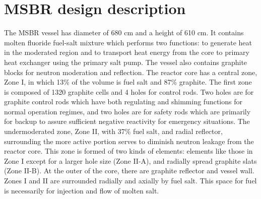 \documentclass{anstrans}
\begin{document}
\section{MSBR design description}
The MSBR vessel has diameter of 680 cm and a height of 610 cm. It contains molten fluoride fuel-salt mixture which performs two functions: to generate heat in the moderated region and to transport heat energy from the core to primary heat exchanger using the primary salt pump. The vessel also contains graphite blocks for neutron moderation and reflection. The reactor core has a central zone, Zone I, in which 13\% of the volume is fuel salt and 87\% graphite. The first zone is composed of 1320 graphite cells and 4 holes for control rods. Two holes are for graphite control rods which have both regulating and shimming functions for normal operation regimes, and two holes are for safety rods which are primarily for backup to assure sufficient negative reactivity for emergency situations. The undermoderated zone, Zone II, with 37\% fuel salt, and radial reflector, surrounding the more active portion serves to diminish neutron leakage from the reactor core. This zone is formed of two kinds of elements: elements like those in Zone I except for a larger hole size (Zone II-A), and radially spread graphite slats (Zone II-B). At the outer of the core, there are graphite reflector and vessel wall. Zones I and II are surrounded radially and axially by fuel salt. This space for fuel is necessarily for injection and flow of molten salt.
\end{document}
